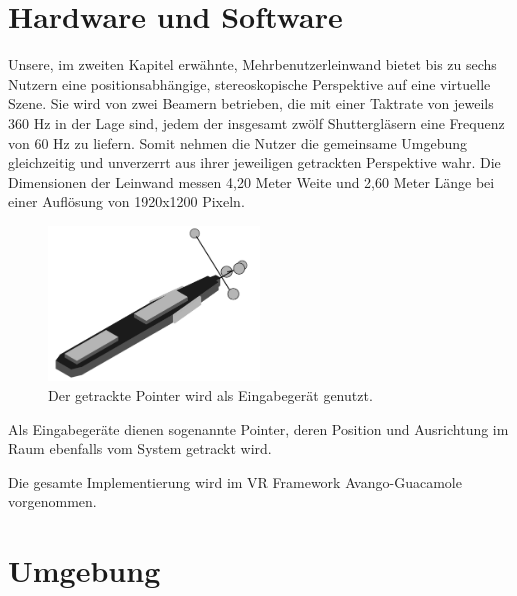\section{Hardware und Software}
Unsere, im zweiten Kapitel erwähnte, Mehrbenutzerleinwand bietet bis zu sechs Nutzern eine positionsabhängige, stereoskopische Perspektive auf eine virtuelle Szene. Sie wird von zwei Beamern betrieben, die mit einer Taktrate von jeweils 360 Hz in der Lage sind, jedem der insgesamt zwölf Shuttergläsern eine Frequenz von 60 Hz zu liefern. Somit nehmen die Nutzer die gemeinsame Umgebung gleichzeitig und unverzerrt aus ihrer jeweiligen getrackten Perspektive wahr. Die Dimensionen der Leinwand messen 4,20 Meter Weite und 2,60 Meter Länge bei einer Auflösung von 1920x1200 Pixeln.

\begin{figure}[h]
  \centering
  \includegraphics[width=0.5\textwidth]{images/pointer.png}
  \caption{Der getrackte Pointer wird als Eingabegerät genutzt.}
  \label{fig:todo}
\end{figure}

Als Eingabegeräte dienen sogenannte \glqq Pointer\grqq{}, deren Position und Ausrichtung im Raum ebenfalls vom System getrackt wird.

Die gesamte Implementierung wird im VR Framework Avango-Guacamole \cite{Schneegans2014Guacamole-AnShading} vorgenommen.

\section{Umgebung}

